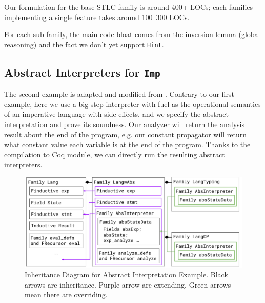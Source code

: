 Our formulation for the base STLC family is around 400+ LOCs; each families implementing a single feature takes around 100~300 LOCs. 

For each sub family, the main code bloat comes from the inversion lemma (global reasoning) and the fact we don't yet support  \texttt{Hint}.


\subsection{Abstract Interpreters for \texttt{Imp}}
\label{sec:coqexample-analysis}
The second example is adapted and modified from \citet{zm2017}.
Contrary to our first example, here we use a big-step interpreter with fuel
as the operational semantics of an imperative language with
side effects, and we specify the abstract interpretation and prove its
soundness. 
Our analyzer will return the analysis result about the end of the program, e.g. our constant propagator will return what constant value each variable is at the end of the program. Thanks to the compilation to Coq module, we can directly run the resulting abstract interpreters.



\begin{figure}[!htb]
  \includegraphics[width=\columnwidth]{coqexmaple/Family-Lang-Imp3.pdf}
  \caption{Inheritance Diagram for Abstract Interpretation Example. Black arrows are inheritance. Purple arrow are extending. Green arrows mean there are overriding.}\label{fig:abstract-interpretation-example}
\end{figure}

